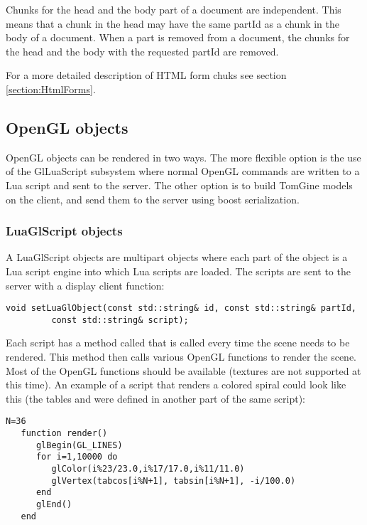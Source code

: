 Chunks for the head and the body part of a document are independent. This means
that a chunk in the head may have the same partId as a chunk in the body of
a document. When a part is removed from a document, the chunks for the head
and the body with the requested partId are removed.

For a more detailed description of HTML form chuks see section
\ref{section:HtmlForms}.

\subsection{OpenGL objects}

OpenGL objects can be rendered in two ways. The more flexible option is the use
of the GlLuaScript subsystem where normal OpenGL commands are written to a Lua
script and sent to the server. The other option is to build TomGine models on
the client, and send them to the server using boost serialization. 


\subsubsection{LuaGlScript objects}

A LuaGlScript objects are multipart objects where each part of the object is a
Lua script engine into which Lua scripts are loaded. The scripts are sent to
the server with a display client function:

\begin{Verbatim}[fontsize=\scriptsize,gobble=3]
   void setLuaGlObject(const std::string& id, const std::string& partId,
         const std::string& script);
\end{Verbatim}

Each script has a method called  that is called every time the
scene needs to be rendered.  This method then calls various OpenGL functions to
render the scene. Most of the OpenGL functions should be available (textures
are not supported at this time). An example of a script that renders a colored
spiral could look like this (the tables  and  were
defined in another part of the same script):

\begin{Verbatim}[fontsize=\scriptsize,gobble=3]
   N=36
   function render()
      glBegin(GL_LINES)
      for i=1,10000 do
         glColor(i%23/23.0,i%17/17.0,i%11/11.0)
         glVertex(tabcos[i%N+1], tabsin[i%N+1], -i/100.0)
      end
      glEnd()
   end
\end{Verbatim}

